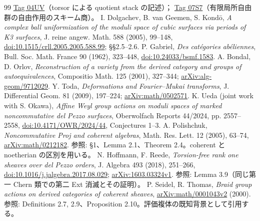 \documentclass[11pt,a4paper]{ltjsarticle}
\theoremstyle{definition}\newtheorem{remark}[theorem]{注意}
\begin{document}
\begin{thebibliography}{99}
\href{https://stacks.math.columbia.edu/tag/04UV}{Tag 04UV}（torsor による quotient stack の記述）；
\href{https://stacks.math.columbia.edu/tag/07S7}{Tag 07S7}（有限局所自由群の自由作用のスキーム商）。
 I. Dolgachev, B. van Geemen, S. Kond\=o,
\emph{A complex ball uniformization of the moduli space of cubic surfaces
via periods of K3 surfaces},
J. reine angew. Math. 588 (2005), 99--148,
\href{https://doi.org/10.1515/crll.2005.2005.588.99}{doi:10.1515/crll.2005.2005.588.99};
\S\S 2.5--2.6.
 P. Gabriel, \emph{Des catégories abéliennes},
Bull. Soc. Math. France 90 (1962), 323--448,
\href{https://doi.org/10.24033/bsmf.1583}{doi:10.24033/bsmf.1583}.
 A. Bondal, D. Orlov,
\emph{Reconstruction of a variety from the derived category and groups of autoequivalences},
Compositio Math. 125 (2001), 327--344;
\href{https://arxiv.org/abs/alg-geom/9712029}{arXiv:alg-geom/9712029}.
 Y. Toda, \emph{Deformations and Fourier--Mukai transforms},
J. Differential Geom. 81 (2009), 197--224;
\href{https://arxiv.org/abs/math/0502571}{arXiv:math/0502571}.
 K. Ueda (joint work with S. Okawa),
\emph{Affine Weyl group actions on moduli spaces of marked noncommutative del Pezzo surfaces},
Oberwolfach Reports 44/2024, pp. 2557--2558,
\href{https://doi.org/10.4171/OWR/2024/44}{doi:10.4171/OWR/2024/44}, Conjectures 1--3.
 A. Polishchuk,
\emph{Noncommutative Proj and coherent algebras},
Math. Res. Lett. 12 (2005), 63--74,
\href{https://arxiv.org/abs/math/0212182}{arXiv:math/0212182}.
参照: \S1、Lemma 2.1、Theorem 2.4。coherent と noetherian の区別を用いる。
 N. Hoffmann, F. Reede,
\emph{Torsion-free rank one sheaves over del Pezzo orders},
J. Algebra 493 (2018), 251--266,
\href{https://doi.org/10.1016/j.jalgebra.2017.08.029}{doi:10.1016/j.jalgebra.2017.08.029};
\href{https://arxiv.org/abs/1603.03324}{arXiv:1603.03324v1}.
参照: Lemma 3.9（同じ第一 Chern 類での第二 Ext 消滅とその証明）。
 P. Seidel, R. Thomas,
\emph{Braid group actions on derived categories of coherent sheaves},
\href{https://arxiv.org/abs/math/0001043}{arXiv:math/0001043v2} (2000).
参照: Definitions 2.7, 2.9、Proposition 2.10。評価複体の既知背景として引用する。
\end{thebibliography}
\end{document}
